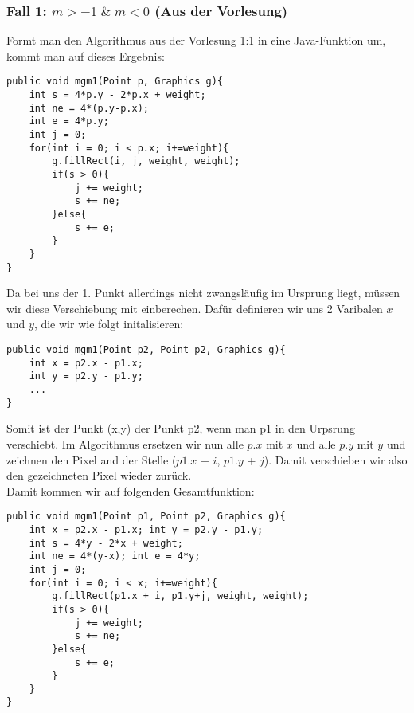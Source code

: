 \documentclass[a4paper,10pt]{article}
\begin{document}
\subsubsection{Fall 1: $m > -1 \;\&\; m < 0$ (Aus der Vorlesung)}
Formt man den Algorithmus aus der Vorlesung 1:1 in eine Java-Funktion um, kommt man auf dieses Ergebnis:
\begin{lstlisting}
public void mgm1(Point p, Graphics g){
    int s = 4*p.y - 2*p.x + weight;
    int ne = 4*(p.y-p.x);
    int e = 4*p.y;
    int j = 0;
    for(int i = 0; i < p.x; i+=weight){
        g.fillRect(i, j, weight, weight);
        if(s > 0){
            j += weight;
            s += ne;
        }else{
            s += e;
        }
    }
}
\end{lstlisting}
Da bei uns der 1. Punkt allerdings nicht zwangsläufig im Ursprung liegt, müssen wir diese Verschiebung mit einberechen. Dafür definieren wir uns 2 Varibalen $x$ und $y$, die wir wie folgt initalisieren:
\begin{lstlisting}
public void mgm1(Point p2, Point p2, Graphics g){
    int x = p2.x - p1.x;
    int y = p2.y - p1.y;
    ...
}
\end{lstlisting}
Somit ist der Punkt (x,y) der Punkt p2, wenn man p1 in den Urpsrung verschiebt. Im Algorithmus ersetzen wir nun alle $p.x$ mit $x$ und alle $p.y$ mit $y$ und zeichnen den Pixel and der Stelle ($p1.x$ + $i$, $p1.y$ + $j$).
Damit verschieben wir also den gezeichneten Pixel wieder zurück.\\Damit kommen wir auf folgenden Gesamtfunktion:
\begin{lstlisting}
public void mgm1(Point p1, Point p2, Graphics g){
    int x = p2.x - p1.x; int y = p2.y - p1.y;
    int s = 4*y - 2*x + weight;
    int ne = 4*(y-x); int e = 4*y;
    int j = 0;
    for(int i = 0; i < x; i+=weight){
        g.fillRect(p1.x + i, p1.y+j, weight, weight);
        if(s > 0){
            j += weight;
            s += ne;
        }else{
            s += e;
        }
    }
} 
\end{lstlisting}
\end{document}

